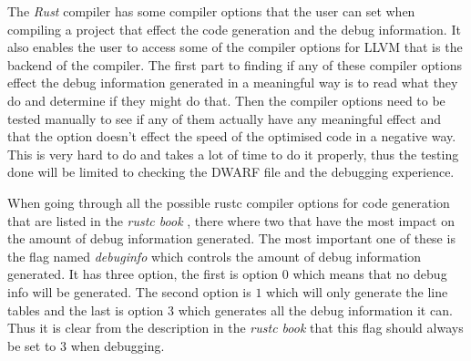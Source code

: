 
The \emph{Rust} compiler has some compiler options that the user can set when compiling a project that effect the code generation and the debug information.
It also enables the user to access some of the compiler options for \gls{LLVM} that is the backend of the compiler.
The first part to finding if any of these compiler options effect the debug information generated in a meaningful way is to read what they do and determine if they might do that.
Then the compiler options need to be tested manually to see if any of them actually have any meaningful effect and that the option doesn't effect the speed of the optimised code in a negative way.
This is very hard to do and takes a lot of time to do it properly, thus the testing done will be limited to checking the \gls{DWARF} file and the debugging experience.


When going through all the possible \gls{rustc} compiler options for code generation that are listed in the \emph{rustc book} \cite{rustc-book-codegen}, there where two that have the most impact on the amount of debug information generated.
The most important one of these is the flag named \emph{debuginfo} which controls the amount of debug information generated.
It has three option, the first is option $0$ which means that no debug info will be generated.
The second option is $1$ which will only generate the line tables and the last is option $3$ which generates all the debug information it can.
Thus it is clear from the description in the \emph{rustc book} that this flag should always be set to $3$ when debugging.


